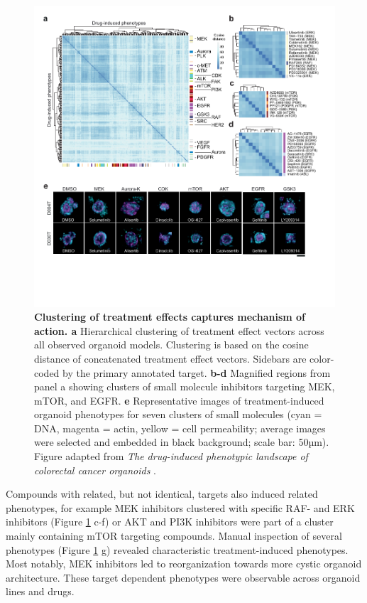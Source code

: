 \begin{flushleft}
\begin{figure}[h!]
\centering
\includegraphics[width=\textwidth,
                height=\textheight,
                keepaspectratio]{figures/promise/pdf/fig_3_1_1.pdf}
\caption[Clustering of treatment effects captures mechanism of action]{\textbf{Clustering of treatment effects captures mechanism of action. a} Hierarchical clustering of treatment effect vectors across all observed organoid models. Clustering is based on the cosine distance of concatenated treatment effect vectors. Sidebars are color-coded by the primary annotated target. \textbf{b-d} Magnified regions from panel a showing clusters of small molecule inhibitors targeting MEK, mTOR, and EGFR. \textbf{e} Representative images of treatment-induced organoid phenotypes for seven clusters of small molecules (cyan = DNA, magenta = actin, yellow = cell permeability; average images were selected and embedded in black background; scale bar: 50µm). Figure adapted from \textit{The drug-induced phenotypic landscape of colorectal cancer organoids} \parencite{betgeDruginducedPhenotypicLandscape2022}.}
\label{fig_231}
\end{figure}
\bigbreak

Compounds with related, but not identical, targets also induced related phenotypes, for example MEK inhibitors clustered with specific RAF- and ERK inhibitors (Figure \ref{fig_231} c-f) or AKT and PI3K inhibitors were part of a cluster mainly containing mTOR targeting compounds. Manual inspection of several phenotypes (Figure \ref{fig_231} g) revealed characteristic treatment-induced phenotypes. Most notably, MEK inhibitors led to reorganization towards more cystic organoid architecture. These target dependent phenotypes were observable across organoid lines and drugs.



\end{flushleft}
